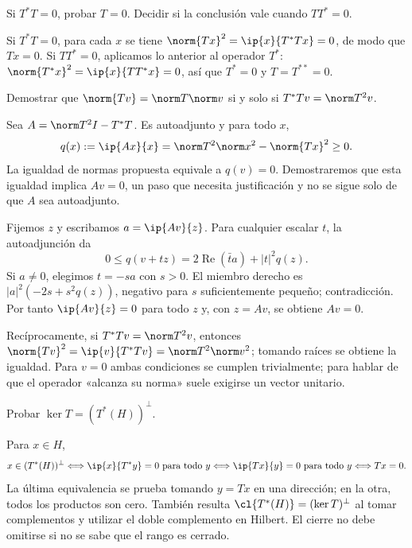 \begin{ejercicio}
Si $T^*T=0$, probar $T=0$. Decidir si la conclusión vale cuando $TT^*=0$.
\end{ejercicio}
\begin{solucion}
Si $T^*T=0$, para cada $x$ se tiene $\norm{Tx}^{2}=\ip{x}{T^*Tx}=0$, de modo que $Tx=0$. Si $TT^*=0$, aplicamos lo anterior al operador $T^*$: $\norm{T^*x}^{2}=\ip{x}{TT^*x}=0$, así que $T^*=0$ y $T=T^{**}=0$.
\end{solucion}

\begin{ejercicio}
Demostrar que $\norm{Tv}=\norm T\norm v$ si y solo si $T^*Tv=\norm T^{2}v$.
\end{ejercicio}
\begin{solucion}
Sea $A=\norm T^{2}I-T^*T$. Es autoadjunto y para todo $x$,
\[
 q(x):=\ip{Ax}{x}=\norm T^{2}\norm x^{2}-\norm{Tx}^{2}\geq0.
\]
La igualdad de normas propuesta equivale a $q(v)=0$. Demostraremos que esta igualdad implica $Av=0$, un paso que necesita justificación y no se sigue solo de que $A$ sea autoadjunto.

Fijemos $z$ y escribamos $a=\ip{Av}{z}$. Para cualquier escalar $t$, la autoadjunción da
\[
0\leq q(v+tz)=2\operatorname{Re}(\bar t a)+|t|^{2}q(z).
\]
Si $a\ne0$, elegimos $t=-sa$ con $s>0$. El miembro derecho es $|a|^{2}(-2s+s^{2}q(z))$, negativo para $s$ suficientemente pequeño; contradicción. Por tanto $\ip{Av}{z}=0$ para todo $z$ y, con $z=Av$, se obtiene $Av=0$.

Recíprocamente, si $T^*Tv=\norm T^{2}v$, entonces $\norm{Tv}^{2}=\ip{v}{T^*Tv}=\norm T^{2}\norm v^{2}$; tomando raíces se obtiene la igualdad. Para $v=0$ ambas condiciones se cumplen trivialmente; para hablar de que el operador «alcanza su norma» suele exigirse un vector unitario.
\end{solucion}

\begin{ejercicio}
Probar $\ker T=(T^*(H))^{\perp}$.
\end{ejercicio}
\begin{solucion}
Para $x\in H$,
\[
 x\in(T^*(H))^{\perp}
 \Longleftrightarrow \ip{x}{T^*y}=0\text{ para todo }y
 \Longleftrightarrow \ip{Tx}{y}=0\text{ para todo }y
 \Longleftrightarrow Tx=0.
\]
La última equivalencia se prueba tomando $y=Tx$ en una dirección; en la otra, todos los productos son cero. También resulta $\cl{T^*(H)}=(\ker T)^{\perp}$ al tomar complementos y utilizar el doble complemento en Hilbert. El cierre no debe omitirse si no se sabe que el rango es cerrado.
\end{solucion}

